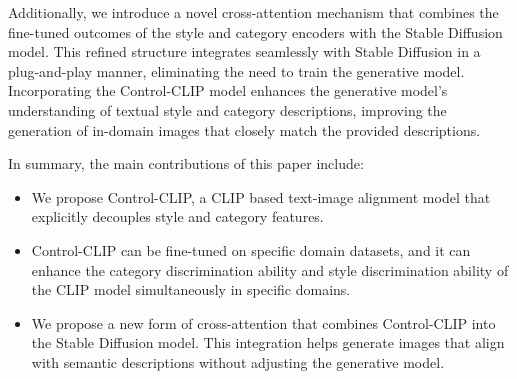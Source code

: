 Additionally, we introduce a novel cross-attention mechanism that combines the fine-tuned outcomes of the style and category encoders with the Stable Diffusion~\cite{rombach2022high} model. This refined structure integrates seamlessly with Stable Diffusion in a plug-and-play manner, eliminating the need to train the generative model. Incorporating the Control-CLIP model enhances the generative model's understanding of textual style and category descriptions, improving the generation of in-domain images that closely match the provided descriptions.



In summary, the main contributions of this paper include:
\begin{itemize}
\item We propose Control-CLIP, a CLIP based text-image alignment model that explicitly decouples style and category features.
\item  Control-CLIP can be fine-tuned on specific domain datasets, and it can enhance the category discrimination ability and style discrimination ability of the CLIP model simultaneously in specific domains. 
\item We propose a new form of cross-attention that combines Control-CLIP into the Stable Diffusion model. This integration helps generate images that align with semantic descriptions without adjusting the generative model.
\end{itemize}

